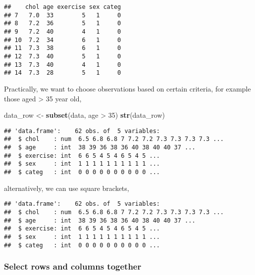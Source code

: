 \documentclass[]{book}
\newenvironment{Shaded}{\begin{snugshade}}{\end{snugshade}}
\newcommand{\KeywordTok}[1]{\textcolor[rgb]{0.13,0.29,0.53}{\textbf{{#1}}}}
\newcommand{\DecValTok}[1]{\textcolor[rgb]{0.00,0.00,0.81}{{#1}}}
\newcommand{\StringTok}[1]{\textcolor[rgb]{0.31,0.60,0.02}{{#1}}}
\newcommand{\NormalTok}[1]{{#1}}
\theoremstyle{definition}
\theoremstyle{definition}
\theoremstyle{remark}
\begin{document}
\begin{verbatim}
##    chol age exercise sex categ
## 7   7.0  33        5   1     0
## 8   7.2  36        5   1     0
## 9   7.2  40        4   1     0
## 10  7.2  34        6   1     0
## 11  7.3  38        6   1     0
## 12  7.3  40        5   1     0
## 13  7.3  40        4   1     0
## 14  7.3  28        5   1     0
\end{verbatim}

Practically, we want to choose observations based on certain criteria,
for example those aged \textgreater{} 35 year old,

\begin{Shaded}
\begin{Highlighting}[]
\NormalTok{data_row <-}\StringTok{ }\KeywordTok{subset}\NormalTok{(data, age >}\StringTok{ }\DecValTok{35}\NormalTok{)}
\KeywordTok{str}\NormalTok{(data_row)}
\end{Highlighting}
\end{Shaded}

\begin{verbatim}
## 'data.frame':    62 obs. of  5 variables:
##  $ chol    : num  6.5 6.8 6.8 7 7.2 7.2 7.3 7.3 7.3 7.3 ...
##  $ age     : int  38 39 36 38 36 40 38 40 40 37 ...
##  $ exercise: int  6 6 5 4 5 4 6 5 4 5 ...
##  $ sex     : int  1 1 1 1 1 1 1 1 1 1 ...
##  $ categ   : int  0 0 0 0 0 0 0 0 0 0 ...
\end{verbatim}

alternatively, we can use square brackets,

\begin{Shaded}
\end{Shaded}

\begin{verbatim}
## 'data.frame':    62 obs. of  5 variables:
##  $ chol    : num  6.5 6.8 6.8 7 7.2 7.2 7.3 7.3 7.3 7.3 ...
##  $ age     : int  38 39 36 38 36 40 38 40 40 37 ...
##  $ exercise: int  6 6 5 4 5 4 6 5 4 5 ...
##  $ sex     : int  1 1 1 1 1 1 1 1 1 1 ...
##  $ categ   : int  0 0 0 0 0 0 0 0 0 0 ...
\end{verbatim}

\subsubsection{Select rows and columns
together}\label{select-rows-and-columns-together}
\end{document}
